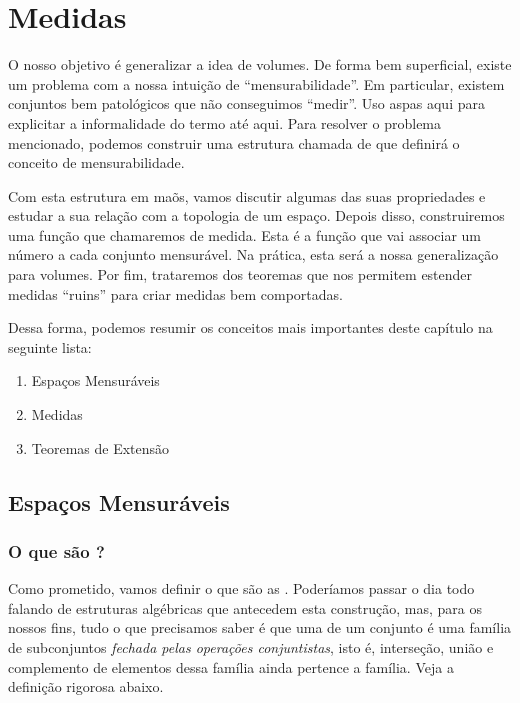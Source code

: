 \chapter{Medidas}

O nosso objetivo é generalizar a idea de volumes. De forma bem superficial, existe um problema com a nossa intuição de ``mensurabilidade''. Em particular, existem conjuntos bem patológicos que não conseguimos ``medir''. Uso aspas aqui para explicitar a informalidade do termo até aqui. Para resolver o problema mencionado, podemos construir uma estrutura chamada de \sigmaAlg que definirá o conceito de mensurabilidade.

Com esta estrutura em maõs, vamos discutir algumas das suas propriedades e estudar a sua relação com a topologia de um espaço. Depois disso, construiremos uma função que chamaremos de medida. Esta é a função que vai associar um número a cada conjunto mensurável. Na prática, esta será a nossa generalização para volumes. Por fim, trataremos dos teoremas que nos permitem estender medidas ``ruins'' para criar medidas bem comportadas.

Dessa forma, podemos resumir os conceitos mais importantes deste capítulo na seguinte lista:

\begin{enumerate}
    \item Espaços Mensuráveis
    \item Medidas
    \item Teoremas de Extensão
\end{enumerate}















\section{Espaços Mensuráveis}
\subsection{O que são \sigmaAlgs?}
Como prometido, vamos definir o que são as \textbf{\sigmaAlgs}. Poderíamos passar o dia todo falando de estruturas algébricas que antecedem esta construção, mas, para os nossos fins, tudo o que precisamos saber é que uma \sigmaAlg de um conjunto é uma família de subconjuntos \textit{fechada pelas operações conjuntistas}, isto é, interseção, união e complemento de elementos dessa família ainda pertence a família. Veja a definição rigorosa abaixo.

